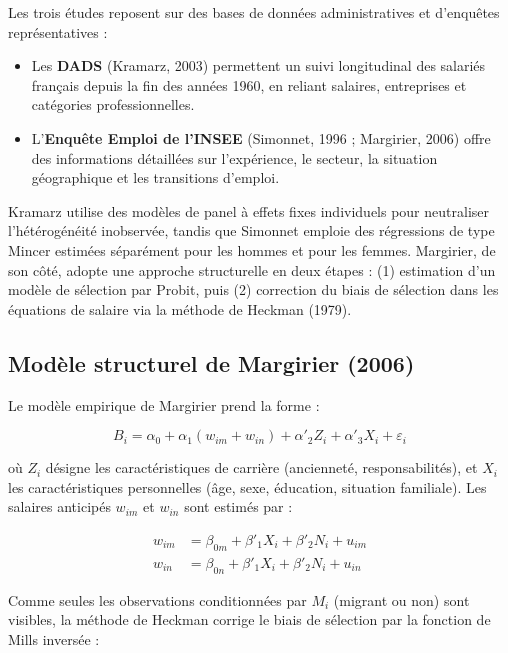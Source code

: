 \documentclass[12pt,a4paper]{article}
\begin{document}
Les trois études reposent sur des bases de données administratives et d’enquêtes représentatives :
\begin{itemize}
    \item Les \textbf{DADS} (Kramarz, 2003) permettent un suivi longitudinal des salariés français depuis la fin des années 1960, en reliant salaires, entreprises et catégories professionnelles.
    \item L’\textbf{Enquête Emploi de l’INSEE} (Simonnet, 1996 ; Margirier, 2006) offre des informations détaillées sur l’expérience, le secteur, la situation géographique et les transitions d’emploi.
\end{itemize}

Kramarz utilise des modèles de panel à effets fixes individuels pour neutraliser l’hétérogénéité inobservée, tandis que Simonnet emploie des régressions de type Mincer estimées séparément pour les hommes et pour les femmes.  
Margirier, de son côté, adopte une approche structurelle en deux étapes :  
(1) estimation d’un modèle de sélection par Probit, puis  
(2) correction du biais de sélection dans les équations de salaire via la méthode de Heckman (1979).

\subsection*{Modèle structurel de Margirier (2006)}

Le modèle empirique de Margirier prend la forme :

\begin{equation}
B_i = \alpha_0 + \alpha_1 (w_{im} + w_{in}) + \alpha'_2 Z_i + \alpha'_3 X_i + \varepsilon_i
\end{equation}

où $Z_i$ désigne les caractéristiques de carrière (ancienneté, responsabilités), et $X_i$ les caractéristiques personnelles (âge, sexe, éducation, situation familiale).  
Les salaires anticipés $w_{im}$ et $w_{in}$ sont estimés par :

\begin{align}
w_{im} &= \beta_{0m} + \beta'_1 X_i + \beta'_2 N_i + u_{im} \\
w_{in} &= \beta_{0n} + \beta'_1 X_i + \beta'_2 N_i + u_{in}
\end{align}

Comme seules les observations conditionnées par $M_i$ (migrant ou non) sont visibles, la méthode de Heckman corrige le biais de sélection par la fonction de Mills inversée :
\end{document}
